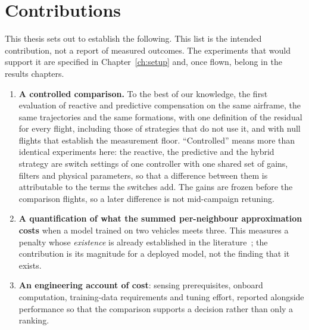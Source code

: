 \section{Contributions}
\label{sec:intro-contrib}

This thesis sets out to establish the following. This list is the intended contribution, not a
report of measured outcomes. The experiments that would support it are specified in
Chapter~\ref{ch:setup} and, once flown, belong in the results chapters.

\begin{enumerate}
  \item \textbf{A controlled comparison.} To the best of our knowledge, the first evaluation of
    reactive and predictive compensation on the same airframe, the same trajectories and the same
    formations, with one definition of the residual for every flight, including those of
    strategies that do not use it, and with null flights that establish the measurement floor.
    ``Controlled'' means more than identical experiments here: the reactive, the predictive and the
    hybrid strategy are switch settings of one controller with one shared set of gains, filters and
    physical parameters, so that a difference between them is attributable to the terms the
    switches add. The gains are frozen before the comparison flights, so a later difference is not
    mid-campaign retuning.

  \item \textbf{A quantification of what the summed per-neighbour approximation costs} when a
    model trained on two vehicles meets three. This measures a penalty whose \emph{existence} is
    already established in the literature~\cite{shi2020neuralswarm,gielis2023aggregate}; the
    contribution is its magnitude for a deployed model, not the finding that it exists.

  \item \textbf{An engineering account of cost}: sensing prerequisites, onboard computation,
    training-data requirements and tuning effort, reported alongside performance so that the comparison supports a
    decision rather than only a ranking.

\end{enumerate}

